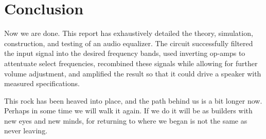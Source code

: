 \documentclass[notitlepage, 12pt]{report}
\begin{document}
\section*{Conclusion}

Now we are done. This report has exhaustively detailed the theory, simulation, 
construction, and testing of an audio equalizer. The circuit successfully 
filtered the input signal into the desired frequency bands, 
used inverting op-amps to attentuate select frequencies, 
recombined these signals while allowing for further volume adjustment, 
and amplified the result so that it could drive a speaker with measured specifications. 

This rock has been heaved into place, and the path behind us is a bit longer now. Perhaps 
in some time we will walk it again. If we do it will be as builders with new eyes 
and new minds, for returning to where we began is not the same as never leaving. 


\printbibliography[title={\Large References}]
\end{document}
